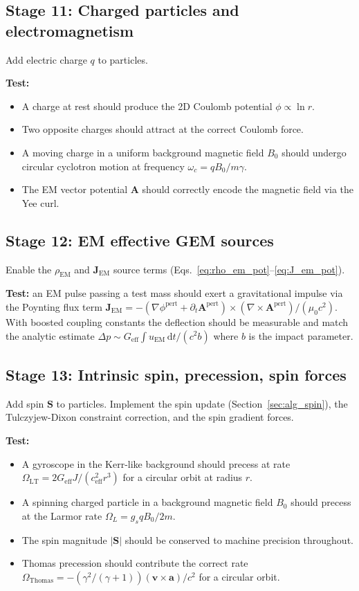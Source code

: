 \documentclass[11pt,a4paper]{article}
\newcommand{\vv}[1]{\mathbf{#1}}
\newcommand{\dd}{\mathrm{d}}
\begin{document}
\subsection{Stage 11: Charged particles and electromagnetism}

Add electric charge $q$ to particles.

\textbf{Test:}
\begin{itemize}
  \item A charge at rest should produce the 2D Coulomb potential $\phi \propto \ln r$.
  \item Two opposite charges should attract at the correct Coulomb force.
  \item A moving charge in a uniform background magnetic field $B_0$ should undergo circular cyclotron motion at frequency $\omega_c = qB_0/m\gamma$.
  \item The EM vector potential $\vv{A}$ should correctly encode the magnetic field via the Yee curl.
\end{itemize}

\subsection{Stage 12: EM effective GEM sources}

Enable the $\rho_{\mathrm{EM}}$ and $\vv{J}_{\mathrm{EM}}$ source terms (Eqs.~\ref{eq:rho_em_pot}--\ref{eq:J_em_pot}).

\textbf{Test:} an EM pulse passing a test mass should exert a gravitational impulse via the Poynting flux term $\vv{J}_{\mathrm{EM}} = -(\nabla\phi^{\mathrm{pert}}+\partial_t\vv{A}^{\mathrm{pert}})\times(\nabla\times\vv{A}^{\mathrm{pert}})/(\mu_0 c^2)$.  With boosted coupling constants the deflection should be measurable and match the analytic estimate $\Delta p \sim G_{\mathrm{eff}}\int u_{\mathrm{EM}}\,\dd t / (c^2 b)$ where $b$ is the impact parameter.

\subsection{Stage 13: Intrinsic spin, precession, spin forces}

Add spin $\vv{S}$ to particles.  Implement the spin update (Section~\ref{sec:alg_spin}), the Tulczyjew-Dixon constraint correction, and the spin gradient forces.

\textbf{Test:}
\begin{itemize}
  \item A gyroscope in the Kerr-like background should precess at rate $\Omega_{\mathrm{LT}} = 2G_{\mathrm{eff}}J/(c_{\mathrm{eff}}^2 r^3)$ for a circular orbit at radius $r$.
  \item A spinning charged particle in a background magnetic field $B_0$ should precess at the Larmor rate $\Omega_L = g_s qB_0/2m$.
  \item The spin magnitude $|\vv{S}|$ should be conserved to machine precision throughout.
  \item Thomas precession should contribute the correct rate $\Omega_{\mathrm{Thomas}} = -(\gamma^2/(\gamma+1))(\vv{v}\times\vv{a})/c^2$ for a circular orbit.
\end{itemize}
\end{document}

